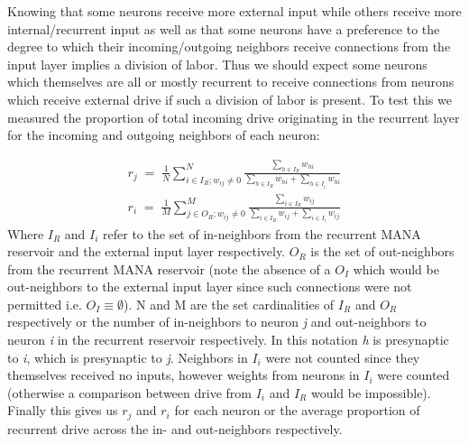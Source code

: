 \documentclass[10pt,letterpaper]{article}
\begin{document}
Knowing that some neurons receive more external input while others receive more internal/recurrent input as well as that some neurons have a preference to the degree to which their incoming/outgoing neighbors receive connections from the input layer implies a division of labor. Thus we should expect some neurons which themselves are all or mostly recurrent to receive connections from neurons which receive external drive if such a division of labor is present. To test this we measured the proportion of total incoming drive originating in the recurrent layer for the incoming and outgoing neighbors of each neuron:

\begin{gather}
	r_j \;=\; \frac{1}{N} \sum_{i \in I_R; w_{ij} \neq 0}^N \frac{\sum_{h \in I_R} w_{hi}}{\sum_{h \in I_R} w_{hi} + \sum_{h \in I_i} w_{hi}}\\
	r_i \;=\; \frac{1}{M} \sum_{j \in O_R; w_{ij} \neq 0}^M \frac{\sum_{i \in I_R} w_{ij}}{\sum_{i \in I_R} w_{ij} + \sum_{i \in I_i} w_{ij}} 
\end{gather}
Where $I_R$ and $I_i$ refer to the set of in-neighbors from the recurrent MANA reservoir and the external input layer respectively. $O_R$ is the set of out-neighbors from the recurrent MANA reservoir (note the absence of a $O_I$ which would be out-neighbors to the external input layer since such connections were not permitted i.e. $O_I \equiv \emptyset$). N and M are the set cardinalities of $I_R$ and $O_R$ respectively or the number of in-neighbors to neuron \emph{j} and out-neighbors to neuron \emph{i} in the recurrent reservoir respectively. In this notation \emph{h} is presynaptic to \emph{i}, which is presynaptic to \emph{j}. Neighbors in $I_i$ were not counted since they themselves received no inputs, however weights from neurons in $I_i$ were counted (otherwise a comparison between drive from $I_i$ and $I_R$ would be impossible). Finally this gives us $r_j$ and $r_i$ for each neuron or the average proportion of recurrent drive across the in- and out-neighbors respectively. 
\end{document}
